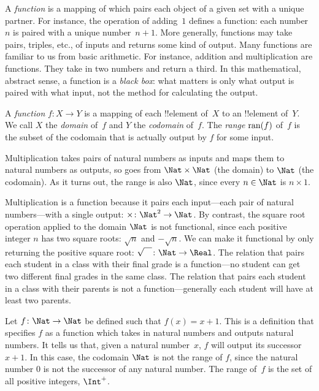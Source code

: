 \documentclass[../../../include/open-logic-section]{subfiles}
\begin{document}

\begin{explain}
A \emph{function} is a mapping of which pairs each object of a given
set with a unique partner. For instance, the operation of adding~$1$
defines a function: each number~$n$ is paired with a unique
number~$n+1$. More generally, functions may take pairs, triples, etc.,
of inputs and returns some kind of output. Many functions are familiar
to us from basic arithmetic. For instance, addition and multiplication
are functions. They take in two numbers and return a third.  In this
mathematical, abstract sense, a function is a \emph{black box}: what
matters is only what output is paired with what input, not the method
for calculating the output.
\end{explain}

\begin{defn}[Function]
A \emph{function} $f \colon X \to Y$ is a mapping of each !!{element}
of~$X$ to an !!{element} of~$Y$. We call $X$ the \emph{domain} of~$f$
and $Y$ the \emph{codomain} of~$f$. The \emph{range} $\mathrm{ran}(f)$ of~$f$
is the subset of the codomain that is actually output by $f$ for some
input.
\end{defn}

\begin{ex}
Multiplication takes pairs of natural numbers as inputs and maps them
to natural numbers as outputs, so goes from $\Nat \times \Nat$ (the
domain) to $\Nat$ (the codomain). As it turns out, the range is also
$\Nat$, since every $n \in \Nat$ is $n \times 1$.
\end{ex}

\begin{explain}
Multiplication is a function because it pairs each input---each pair
of natural numbers---with a single output: $\times \colon \Nat^2 \to
\Nat$. By contrast, the square root operation applied to the domain
$\Nat$ is not functional, since each positive integer $n$ has two
square roots: $\sqrt{n}$ and $-\sqrt{n}$. We can make it functional by
only returning the positive square root: $\sqrt{\phantom{X}} \colon
\Nat \to \Real$. The relation that pairs each student in a class with
their final grade is a function---no student can get two different
final grades in the same class. The relation that pairs each student
in a class with their parents is not a function---generally each
student will have at least two parents.
\end{explain}

\begin{ex}
Let $f \colon \Nat \to \Nat$ be defined such that $f(x) = x+1$. This
is a definition that specifies $f$ as a function which takes in
natural numbers and outputs natural numbers. It tells us that, given a
natural number~$x$, $f$ will output its successor~$x+1$.
In this case, the codomain $\Nat$ is not the range of $f$, since the
natural number $0$ is not the successor of any natural number. The
range of~$f$ is the set of all positive integers, $\Int^{+}$.
\end{ex}
\end{document}
